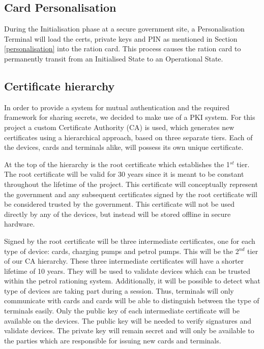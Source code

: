 \documentclass[a4paper,10pt]{llncs}
\begin{document}
\subsection{Card Personalisation}
\label{Design:Personalisation}
During the Initialisation phase at a secure government site, a Personalisation Terminal will load the certs, private keys and PIN as mentioned in Section \ref{personalisation} into the ration card. This process causes the ration card to permanently transit from an Initialised State to an Operational State.

\subsection{Certificate hierarchy}
In order to provide a system for mutual authentication and the required framework for sharing secrets, we decided to make use of a PKI system. For this project a custom Certificate Authority (CA) is used, which generates new certificates using a hierarchical approach, based on three separate tiers. Each of the devices, cards and terminals alike, will possess its own unique certificate.

At the top of the hierarchy is the root certificate which establishes the 1$^{st}$ tier. The root certificate will be valid for 30 years since it is meant to be constant throughout the lifetime of the project. This certificate will conceptually represent the government and any subsequent certificates signed by the root certificate will be considered trusted by the government. This certificate will not be used directly by any of the devices, but instead will be stored offline in secure hardware.

Signed by the root certificate will be three intermediate certificates, one for each type of device: cards, charging pumps and petrol pumps. This will be the 2$^{nd}$ tier of our CA hierarchy. These three intermediate certificates will have a shorter lifetime of 10 years. They will be used to validate devices which can be trusted within the petrol rationing system. Additionally, it will be possible to detect what type of devices are taking part during a session. Thus, terminals will only communicate with cards and cards will be able to distinguish between the type of terminals easily. Only the public key of each intermediate certificate will be available on the devices. The public key will be needed to verify signatures and validate devices. The private key will remain secret and will only be available to the parties which are responsible for issuing new cards and terminals.
\end{document}
